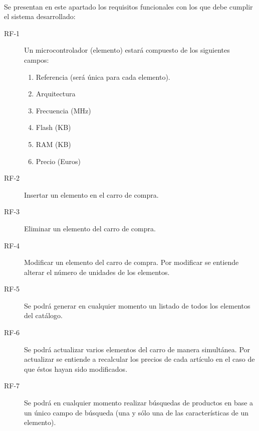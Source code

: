 \paragraph{}Se presentan en este apartado los requisitos funcionales con los que debe cumplir el sistema desarrollado:


\begin{description}
\item[RF-1] Un microcontrolador (elemento) estará compuesto de los siguientes campos: 
	\begin{enumerate}[label=\textbf{\arabic*} -]
		\item Referencia (será única para cada elemento).
        \item Arquitectura
        \item Frecuencia (MHz)
        \item Flash (KB)
        \item RAM (KB)
        \item Precio (Euros)
	\end{enumerate}
	
\item[RF-2] Insertar un elemento en el carro de compra.
   
\item[RF-3] Eliminar un elemento del carro de compra.
	
\item[RF-4] Modificar un elemento del carro de compra. Por modificar se entiende alterar el número de unidades de los elementos.

\item[RF-5] Se podrá generar en cualquier momento un listado de todos los elementos del catálogo.

\item[RF-6] Se podrá actualizar varios elementos del carro de manera simultánea. Por actualizar se entiende a recalcular los precios de cada artículo en el caso de que éstos hayan sido modificados.

\item[RF-7] Se podrá en cualquier momento realizar búsquedas de productos en base a un único campo de búsqueda (una y sólo una de las características de un elemento).
	

\end{description}
